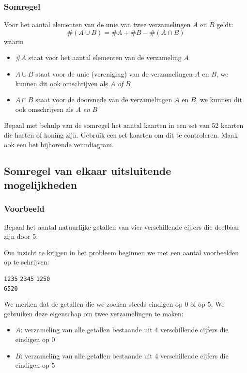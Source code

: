 \documentclass[12pt,a4paper,twoside]{article}
\begin{document}
\subsubsection*{Somregel}
\begin{mdframed}
Voor het aantal elementen van de unie van twee verzamelingen $A$ en $B$ geldt:
$$\#(A \cup B) = \#A + \#B - \#(A \cap B)$$
waarin
\begin{itemize}
  \item $\#A$ staat voor het aantal elementen van de verzameling $A$
  \item $A\cup B$ staat voor de unie (vereniging) van de verzamelingen $A$ en $B$, we kunnen dit ook omschrijven als $A$ {\em of} $B$
  \item $A\cap B$ staat voor de doorsnede van de verzamelingen $A$ en $B$, we kunnen dit ook omschrijven als $A$ {\em en} $B$
\end{itemize}
\end{mdframed}

\begin{oefening}
Bepaal met behulp van de somregel het aantal kaarten in een set van 52 kaarten die harten of koning zijn. Gebruik een set kaarten om dit te controleren. Maak ook een het bijhorende venndiagram.
\end{oefening}

\subsection{Somregel van elkaar uitsluitende mogelijkheden}

\subsubsection*{Voorbeeld}

Bepaal het aantal natuurlijke getallen van vier verschillende cijfers die deelbaar zijn door 5.

Om inzicht te krijgen in het probleem beginnen we met een aantal voorbeelden op te schrijven:
\begin{center}
  \texttt{1235} \qquad \texttt{2345} \qquad \texttt{1250} \\
  \texttt{} \qquad \texttt{6520} \qquad \texttt{}
\end{center}

We merken dat de getallen die we zoeken steeds eindigen op $0$ of op $5$. We gebruiken deze eigenschap om twee verzamelingen te maken:
\begin{itemize}
\item $A$: verzameling van alle getallen bestaande uit 4 verschillende cijfers die eindigen op $0$
\item $B$: verzameling van alle getallen bestaande uit 4 verschillende cijfers die eindigen op $5$
\end{itemize}
\end{document}
